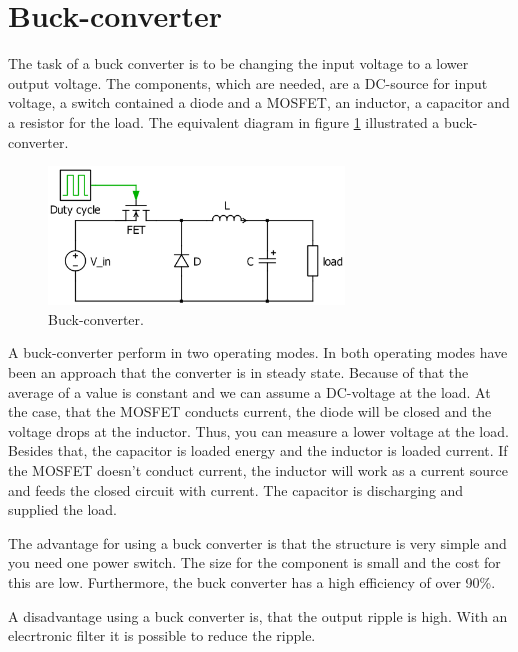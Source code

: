 \section{Buck-converter\label{Buck-C}}

The task of a buck converter is to be changing the input voltage to a lower output voltage. The components, which are needed, are a DC-source for input voltage, a switch contained a diode and a MOSFET, an inductor, a capacitor and a resistor for the load. The equivalent diagram in figure \ref{Buck-converter} illustrated a buck-converter.%

\begin{figure}[htbp]
	\begin{center}
		\includegraphics[width=0.7\textwidth]{../Pictures/Buck-converter}
		\caption{Buck-converter.}
		\label{Buck-converter}
	\end{center}	
\end{figure}

A buck-converter perform in two operating modes. In both operating modes have been an approach that the converter is in steady state. Because of that the average of a value is constant and we can assume a DC-voltage at the load. At the case, that the MOSFET conducts current, the diode will be closed and the voltage drops at the inductor. Thus,  you can measure a lower voltage at the load. Besides that, the capacitor is loaded energy and the inductor is loaded current. If the MOSFET doesn't conduct current, the inductor will work as a current source and feeds the closed circuit with current. The capacitor is discharging and supplied the load.

The advantage for using a buck converter is that the structure is very simple and you need one power switch. The size for the component is small and the cost for this are low. Furthermore, the buck converter has a high efficiency of over 90\%.%

A disadvantage using a buck converter is, that the output ripple is high. With an elecrtronic filter it is possible to reduce the ripple.\cite{advantagebuck}

